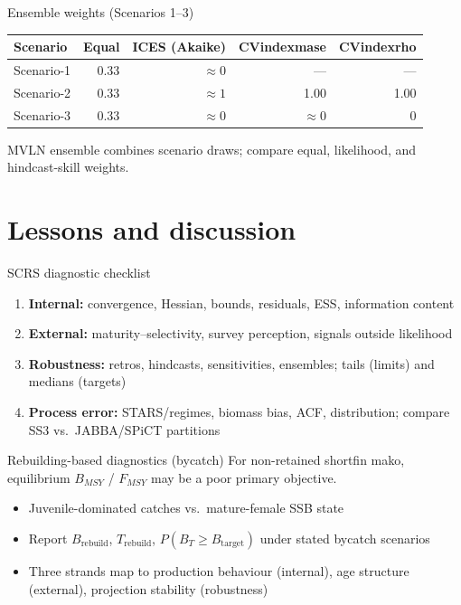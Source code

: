 \documentclass[ignorenonframetext]{beamer}
\begin{document}
\begin{frame}[shrink=8]{Ensemble weights (Scenarios 1--3)}
  \small
  \begin{table}
    \centering
    \begin{tabular}{lrrrr}
      \toprule
      Scenario & Equal & ICES (Akaike) & CVindexmase & CVindexrho \\
      \midrule
      Scenario-1 & 0.33 & $\approx 0$ & --- & --- \\
      Scenario-2 & 0.33 & $\approx 1$ & 1.00 & 1.00 \\
      Scenario-3 & 0.33 & $\approx 0$ & $\approx 0$ & 0 \\
      \bottomrule
    \end{tabular}
  \end{table}
  \vspace{0.3em}
  MVLN ensemble combines scenario draws; compare equal, likelihood, and hindcast-skill weights.
\end{frame}

\section{Lessons and discussion}

\begin{frame}[shrink=8]{SCRS diagnostic checklist}
  \small
  \begin{enumerate}
    \item \textbf{Internal:} convergence, Hessian, bounds, residuals, ESS, information content
    \item \textbf{External:} maturity--selectivity, survey perception, signals outside likelihood
    \item \textbf{Robustness:} retros, hindcasts, sensitivities, ensembles; tails (limits) and medians (targets)
    \item \textbf{Process error:} STARS/regimes, biomass bias, ACF, distribution; compare SS3 vs.\ JABBA/SPiCT partitions
  \end{enumerate}
\end{frame}

\begin{frame}{Rebuilding-based diagnostics (bycatch)}
  \small
  For non-retained shortfin mako, equilibrium $B_{MSY}$ / $F_{MSY}$ may be a poor primary objective.
  \vspace{0.3em}
  \begin{itemize}
    \item Juvenile-dominated catches vs.\ mature-female SSB state
    \item Report $B_{\mathrm{rebuild}}$, $T_{\mathrm{rebuild}}$, $P(B_T \ge B_{\mathrm{target}})$ under stated bycatch scenarios
    \item Three strands map to production behaviour (internal), age structure (external), projection stability (robustness)
  \end{itemize}
\end{frame}
\end{document}
